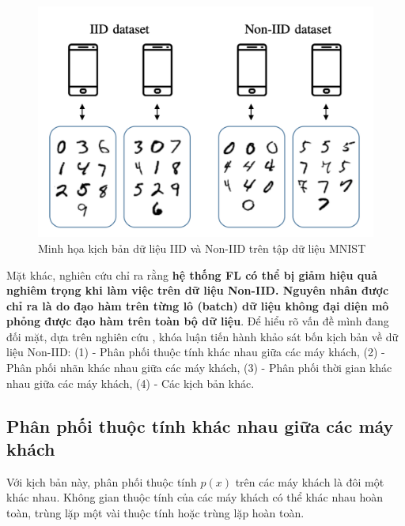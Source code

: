 \begin{figure}[H]
    \centering
    \includegraphics[scale=0.7]{../images/iid_vs_noniid.png}
    \caption{Minh họa kịch bản dữ liệu IID và Non-IID trên tập dữ liệu MNIST \cite{hellstrom2020wireless}}
    \label{fig:iid_noniid}
\end{figure}


Mặt khác, nghiên cứu \cite{zhao2018federated} chỉ ra rằng \textbf{hệ thống FL có thể bị giảm hiệu quả nghiêm trọng khi làm việc trên dữ liệu Non-IID. Nguyên nhân được chỉ ra là do đạo hàm trên từng lô (batch) dữ liệu không đại diện mô phỏng được đạo hàm trên toàn bộ dữ liệu}. Để hiểu rõ vấn đề mình đang đối mặt, dựa trên nghiên cứu \cite{zhu2021federated}, khóa luận tiến hành khảo sát bốn kịch bản về dữ liệu Non-IID: (1) - Phân phối thuộc tính khác nhau giữa các máy khách, (2) - Phân phối nhãn khác nhau giữa các máy khách, (3) - Phân phối thời gian khác nhau giữa các máy khách, (4) - Các kịch bản khác.

\subsection{Phân phối thuộc tính khác nhau giữa các máy khách}

Với kịch bản này, phân phối thuộc tính $p(x)$ trên các máy khách là đôi một khác nhau. Không gian thuộc tính của các máy khách có thể khác nhau hoàn toàn, trùng lặp một vài thuộc tính hoặc trùng lặp hoàn toàn.

